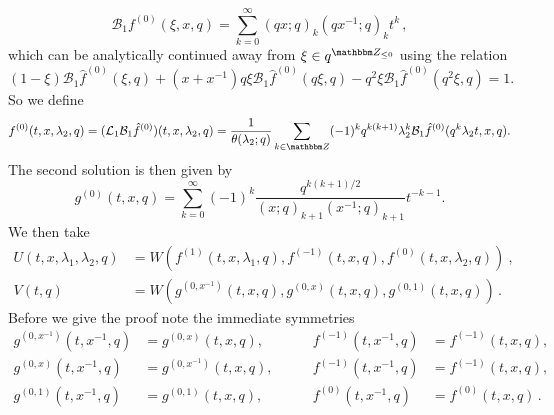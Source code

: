 \documentclass[12pt,reqno]{amsart}
\theoremstyle{definition}
\def\BZ{\mathbbm Z}
\def\be{\begin{equation}}
\def\ee{\end{equation}}
\def\Bor{\mathcal{B}}
\def\Lap{\mathcal{L}}
\begin{document}
\be
  \Bor_{1}f^{(0)}(\xi,x,q)=\sum_{k=0}^{\infty}(qx;q)_{k}(qx^{-1};q)_{k}t^{k} \,,
\ee
which can be analytically continued away from $\xi\in q^{\BZ_{\leq0}}$ using the
relation
\be
(1-\xi)\Bor_{1}\hat{f}^{(0)}(\xi,q)+(x+x^{-1})q\xi \Bor_{1}\hat{f}^{(0)}(q\xi,q)
-q^2\xi \Bor_{1}\hat{f}^{(0)}(q^{2}\xi,q) = 1.
\ee
So we define
\be
\label{f0x}
f^{(0)}(t,x,\lambda_{2},q)
=
(\Lap_{1}\Bor_{1}\hat{f}^{(0)})(t,x,\lambda_{2},q)
=
\frac{1}{\theta(\lambda_{2};q)}\sum_{k\in\BZ}(-1)^{k}q^{k(k+1)}
\lambda_{2}^{k}\Bor_{1}\hat{f}^{(0)}(q^{k}\lambda_{2}t,x,q).
\ee
The second solution is then given by
\be
\label{gGM}
g^{(0)}(t,x,q)
=
\sum_{k=0}^{\infty}(-1)^{k}\frac{q^{k(k+1)/2}}{(x;q)_{k+1}(x^{-1};q)_{k+1}}t^{-k-1}.
\ee
We then take
\be
\label{UVex41x}
\begin{aligned}
  U(t,x,\lambda_{1},\lambda_{2},q) &=
  W(f^{(1)}(t,x,\lambda_{1},q), f^{(-1)}(t,x,q), f^{(0)}(t,x,\lambda_{2},q))\:,\\
V(t,q) &= W(g^{(0,x^{-1})}(t,x,q), g^{(0,x)}(t,x,q), g^{(0,1)}(t,x,q)) \,.
\end{aligned}
\ee
Before we give the proof note the immediate symmetries
\be
\begin{aligned}
g^{(0,x^{-1})}(t,x^{-1},q)
&=
g^{(0,x)}(t,x,q),\qquad
&
f^{(-1)}(t,x^{-1},q)
&=
f^{(-1)}(t,x,q),
\\
g^{(0,x)}(t,x^{-1},q)
&=
g^{(0,x^{-1})}(t,x,q),\qquad
&
f^{(-1)}(t,x^{-1},q)
&=
f^{(-1)}(t,x,q),
\\
g^{(0,1)}(t,x^{-1},q)
&=
g^{(0,1)}(t,x,q),\qquad
&
f^{(0)}(t,x^{-1},q)
&=
f^{(0)}(t,x,q)\,.
  \end{aligned}
\ee
\end{document}
